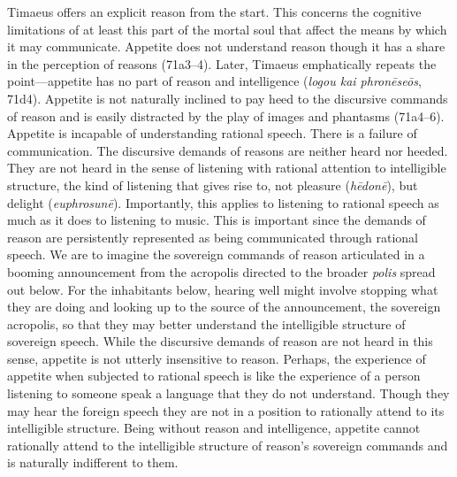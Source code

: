 Timaeus offers an explicit reason from the start. This concerns the cognitive limitations of at least this part of the mortal soul that affect the means by which it may communicate. Appetite does not understand reason though it has a share in the perception of reasons (71a3--4). Later, Timaeus emphatically repeats the point---appetite has no part of reason and intelligence (\emph{logou kai phronēseōs}, 71d4). Appetite is not naturally inclined to pay heed to the discursive commands of reason and is easily distracted by the play of images and phantasms (71a4--6). Appetite is incapable of understanding rational speech. There is a failure of communication. The discursive demands of reasons are neither heard nor heeded. They are not heard in the sense of listening with rational attention to intelligible structure, the kind of listening that gives rise to, not pleasure (\emph{hēdonē}), but delight (\emph{euphrosunē}). Importantly, this applies to listening to rational speech as much as it does to listening to music. This is important since the demands of reason are persistently represented as being communicated through rational speech. We are to imagine the sovereign commands of reason articulated in a booming announcement from the acropolis directed to the broader \emph{polis} spread out below. For the inhabitants below, hearing well might involve stopping what they are doing and looking up to the source of the announcement, the sovereign acropolis, so that they may better understand the intelligible structure of sovereign speech. While the discursive demands of reason are not heard in this sense, appetite is not utterly insensitive to reason. Perhaps, the experience of appetite when subjected to rational speech is like the experience of a person listening to someone speak a language that they do not understand. Though they may hear the foreign speech they are not in a position to rationally attend to its intelligible structure. Being without reason and intelligence, appetite cannot rationally attend to the intelligible structure of reason's sovereign commands and is naturally indifferent to them.

